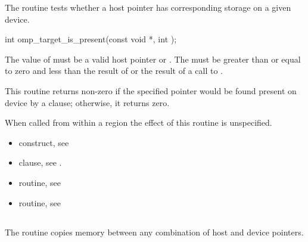 \begin{ccppspecific}
The  routine tests whether a host pointer
has corresponding storage on a given device.

\begin{figure}[t!]
\end{figure}

\format
\begin{ompcFunction}
int omp_target_is_present(const void *, int );
\end{ompcFunction}

\constraints

The value of  must be a valid host pointer or .
The 
must be greater than or equal to zero and less than the result of
 or the result of a call to
.

\effect

This routine returns non-zero if the specified pointer
would be found present on device  by a 
clause; otherwise, it returns zero.

When called from within a  region 
the effect of this routine is unspecified.

\crossreferences
\begin{itemize}
\item {} construct, see 

\item {} clause, see .

\item {} routine, see 

\item {} routine, see 
\end{itemize}


\subsection{}
\label{subsec:omp_target_memcpy}
\summary

The  routine copies memory between any combination
of host and device pointers.


\end{ccppspecific}
